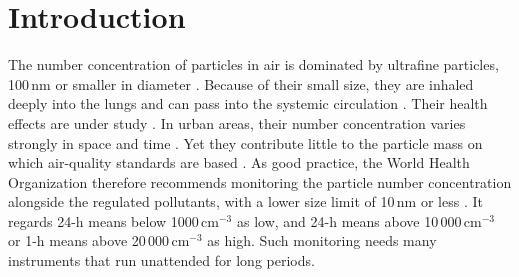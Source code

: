 \documentclass[preprint,review,12pt,authoryear]{elsarticle}
\begin{document}
\section{Introduction}
\label{sec:intro}
The number concentration of particles in air is dominated by ultrafine particles, 100\,nm or smaller
in diameter \citep{hei2013ultrafine,who2021global}. Because of their small size, they are inhaled
deeply into the lungs and can pass into the systemic circulation \citep{ohlwein2019health}. Their
health effects are under study \citep{ohlwein2019health}. In urban areas, their number concentration varies
strongly in space and time \citep{kumar2014ultrafine}.
Yet they contribute little to the particle mass on which air-quality standards are based
\citep{hei2013ultrafine}.
As good practice, the World Health Organization therefore recommends monitoring the particle number
concentration alongside the regulated pollutants, with a lower size limit of 10\,nm or less
\citep[Sect.~4.3]{who2021global}. It regards 24-h means below 1000\,cm$^{-3}$ as low, and 24-h means above
10\,000\,cm$^{-3}$ or 1-h means above 20\,000\,cm$^{-3}$ as high.
Such monitoring needs many instruments that run
unattended for long periods.
\end{document}
